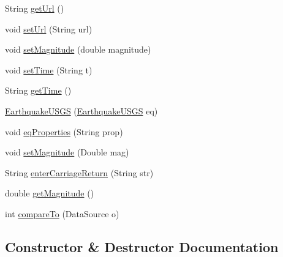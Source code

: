 \begin{DoxyCompactItemize}
String \hyperlink{classbridges_1_1data__src__dependent_1_1_earthquake_u_s_g_s_a2af3938390c31096329e635510df437e}{get\+Url} ()
\item 
void \hyperlink{classbridges_1_1data__src__dependent_1_1_earthquake_u_s_g_s_aaa9d26333e7b80d0f72da58ea2ad41d1}{set\+Url} (String url)
\item 
void \hyperlink{classbridges_1_1data__src__dependent_1_1_earthquake_u_s_g_s_ad7902d80cbbe11046858db1f2792e99d}{set\+Magnitude} (double magnitude)
\item 
void \hyperlink{classbridges_1_1data__src__dependent_1_1_earthquake_u_s_g_s_ae3813930d3468eff007521f33c8e2139}{set\+Time} (String t)
\item 
String \hyperlink{classbridges_1_1data__src__dependent_1_1_earthquake_u_s_g_s_a03397a4410818546c5232f46a3d4ffc4}{get\+Time} ()
\item 
\hyperlink{classbridges_1_1data__src__dependent_1_1_earthquake_u_s_g_s_a6b9281a299d6e60736355eb8833f9e0d}{Earthquake\+U\+S\+GS} (\hyperlink{classbridges_1_1data__src__dependent_1_1_earthquake_u_s_g_s}{Earthquake\+U\+S\+GS} eq)
\item 
void \hyperlink{classbridges_1_1data__src__dependent_1_1_earthquake_u_s_g_s_acc0ba6890ee5963f88a399523f009ae4}{eq\+Properties} (String prop)
\item 
void \hyperlink{classbridges_1_1data__src__dependent_1_1_earthquake_u_s_g_s_a34a4c6ebe01c5daa7c86b3a4207d633f}{set\+Magnitude} (Double mag)
\item 
String \hyperlink{classbridges_1_1data__src__dependent_1_1_earthquake_u_s_g_s_aade0ce9a2fee927b015f5eb495c481e1}{enter\+Carriage\+Return} (String str)
\item 
double \hyperlink{classbridges_1_1data__src__dependent_1_1_earthquake_u_s_g_s_a3ec5d753277d6287b222448ff2477291}{get\+Magnitude} ()
\item 
int \hyperlink{classbridges_1_1data__src__dependent_1_1_earthquake_u_s_g_s_a60cad0a286825f77cd2900265acae982}{compare\+To} (Data\+Source o)
\end{DoxyCompactItemize}


\subsection{Constructor \& Destructor Documentation}
\mbox{\label{classbridges_1_1data__src__dependent_1_1_earthquake_u_s_g_s_a1803f7d357ce045cefbc923e096e9646}} 
